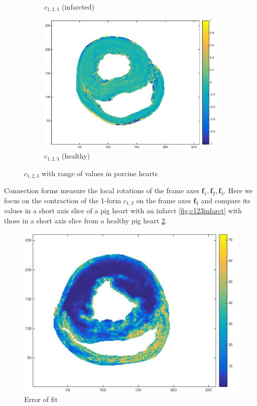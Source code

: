 \begin{figure}[h!]
\begin{subfigure}[h!]{0.3\textwidth}
        \caption{$c_{1,2,3}$ (infarcted)}
        \label{fig:c123infarcted}
    \end{subfigure}
    \hfill
    \begin{subfigure}[h!]{0.3\textwidth}
        \centering
        \includegraphics[width=\textwidth]{figures/pig25_c123_slice_30}
        \caption{$c_{1,2,3}$ (healthy)}
        \label{fig:c123healthy}
    \end{subfigure}
    \caption{$c_{1,2,3}$ with range of values in porcine hearts}
    \label{fig:c123}
\end{figure}

 Connection forms measure the local rotations of the frame axes $\mathbf{f}_1, \mathbf{f}_2, \mathbf{f}_3$. Here we focus on the contraction of the 1-form $c_{1,2}$ on the frame axes $\mathbf{f}_3$ and compare its values in a short axis slice of a pig heart with an infarct \ref{fig:c123infarct} with those in a short axis slice from a healthy pig heart \ref{fig:c123healthy}. \\
 
 \begin{figure}
     \centering
     \includegraphics[width=\textwidth]{figures/pig4_error_of_fit_slice_19}
     \caption{Error of fit}
     \label{fig:error_of_fit}
 \end{figure}
 
